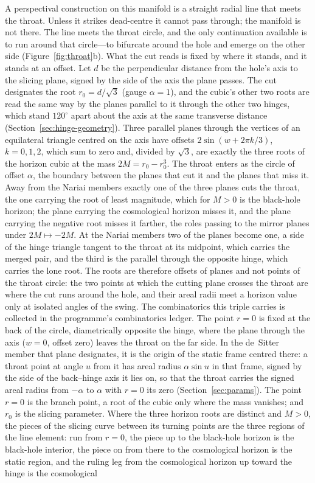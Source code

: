\documentclass[11pt,a4paper]{article}
\theoremstyle{definition}
\begin{document}
A perspectival construction on this manifold is a straight radial line that meets the throat. Unless it strikes dead-centre it cannot pass through; the manifold is not there. The line meets the throat circle, and the only continuation available is to run around that circle---to bifurcate around the hole and emerge on the other side (Figure~\ref{fig:throat}b). What the cut reads is fixed by where it stands, and it stands at an offset. Let $d$ be the perpendicular distance from the hole's axis to the slicing plane, signed by the side of the axis the plane passes. The cut designates the root $r_{0}=d/\sqrt3$ (gauge $\alpha=1$), and the cubic's other two roots are read the same way by the planes parallel to it through the other two hinges, which stand $120^{\circ}$ apart about the axis at the same transverse distance (Section~\ref{sec:hinge-geometry}). Three parallel planes through the vertices of an equilateral triangle centred on the axis have offsets $2\sin(w+2\pi k/3)$, $k=0,1,2$, which sum to zero and, divided by $\sqrt3$, are exactly the three roots of the horizon cubic at the mass $2M=r_{0}-r_{0}^{3}$. The throat enters as the circle of offset $\alpha$, the boundary between the planes that cut it and the planes that miss it. Away from the Nariai members exactly one of the three planes cuts the throat, the one carrying the root of least magnitude, which for $M>0$ is the black-hole horizon; the plane carrying the cosmological horizon misses it, and the plane carrying the negative root misses it farther, the roles passing to the mirror planes under $2M\mapsto-2M$. At the Nariai members two of the planes become one, a side of the hinge triangle tangent to the throat at its midpoint, which carries the merged pair, and the third is the parallel through the opposite hinge, which carries the lone root. The roots are therefore offsets of planes and not points of the throat circle: the two points at which the cutting plane crosses the throat are where the cut runs around the hole, and their areal radii meet a horizon value only at isolated angles of the swing. The combinatorics this triple carries is collected in the programme's combinatorics ledger. The point $r=0$ is fixed at the back of the circle, diametrically opposite the hinge, where the plane through the axis ($w=0$, offset zero) leaves the throat on the far side. In the de~Sitter member that plane designates, it is the origin of the static frame centred there: a throat point at angle $u$ from it has areal radius $\alpha\sin u$ in that frame, signed by the side of the back--hinge axis it lies on, so that the throat carries the signed areal radius from $-\alpha$ to $\alpha$ with $r=0$ its zero (Section~\ref{sec:params}). The point $r=0$ is the branch point, a root of the cubic only where the mass vanishes; and $r_{0}$ is the slicing parameter. Where the three horizon roots are distinct and $M>0$, the pieces of the slicing curve between its turning points are the three regions of the line element: run from $r=0$, the piece up to the black-hole horizon is the black-hole interior, the piece on from there to the cosmological horizon is the static region, and the ruling leg from the cosmological horizon up toward the hinge is the cosmological 
\end{document}
